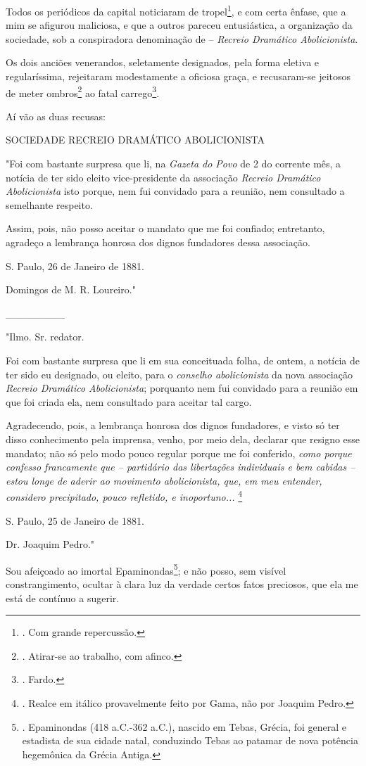 Todos os periódicos da capital noticiaram de tropel\footnote{. Com
  grande repercussão.}, e com certa ênfase, que a mim se afigurou
maliciosa, e que a outros pareceu entusiástica, a organização da
sociedade, sob a conspiradora denominação de -- \emph{Recreio Dramático
Abolicionista}.

Os dois anciões venerandos, seletamente designados, pela forma eletiva e
regularíssima, rejeitaram modestamente a oficiosa graça, e recusaram-se
jeitosos de meter ombros\footnote{. Atirar-se ao trabalho, com afinco.}
ao fatal carrego\footnote{. Fardo.}.

Aí vão as duas recusas:

SOCIEDADE RECREIO DRAMÁTICO ABOLICIONISTA

"Foi com bastante surpresa que li, na \emph{Gazeta do Povo} de 2 do
corrente mês, a notícia de ter sido eleito vice-presidente da associação
\emph{Recreio Dramático Abolicionista} isto porque, nem fui convidado
para a reunião, nem consultado a semelhante respeito.

Assim, pois, não posso aceitar o mandato que me foi confiado;
entretanto, agradeço a lembrança honrosa dos dignos fundadores dessa
associação.

S. Paulo, 26 de Janeiro de 1881.

Domingos de M. R. Loureiro."

\_\_\_\_\_\_\_\_

"Ilmo. Sr. redator.

Foi com bastante surpresa que li em sua conceituada folha, de ontem, a
notícia de ter sido eu designado, ou eleito, para o \emph{conselho
abolicionista} da nova associação \emph{Recreio Dramático
Abolicionista}; porquanto nem fui convidado para a reunião em que foi
criada ela, nem consultado para aceitar tal cargo.

Agradecendo, pois, a lembrança honrosa dos dignos fundadores, e visto só
ter disso conhecimento pela imprensa, venho, por meio dela, declarar que
resigno esse mandato; não só pelo modo pouco regular porque me foi
conferido, \emph{como porque confesso francamente que -- partidário das
libertações individuais e bem cabidas -- estou longe de aderir ao
movimento abolicionista, que, em meu entender, considero precipitado,
pouco refletido, e inoportuno...} \footnote{. Realce em itálico
  provavelmente feito por Gama, não por Joaquim Pedro.}

S. Paulo, 25 de Janeiro de 1881.

Dr. Joaquim Pedro."

Sou afeiçoado ao imortal Epaminondas\footnote{. Epaminondas (418
  a.C.-362 a.C.), nascido em Tebas, Grécia, foi general e estadista de
  sua cidade natal, conduzindo Tebas ao patamar de nova potência
  hegemônica da Grécia Antiga.}; e não posso, sem visível
constrangimento, ocultar à clara luz da verdade certos fatos preciosos,
que ela me está de contínuo a sugerir.

